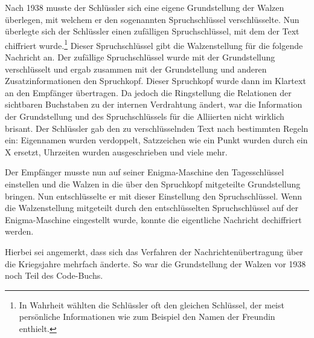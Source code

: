 \newpage

Nach 1938 musste der Schlüssler sich eine eigene Grundstellung der Walzen überlegen, mit welchem er den sogenannten Spruchschlüssel verschlüsselte.
Nun überlegte sich der Schlüssler einen \glqq zufälligen\grqq{} Spruchschlüssel, mit dem der Text chiffriert wurde.\footnote{In Wahrheit wählten die Schlüssler oft den gleichen Schlüssel, der meist persönliche Informationen wie zum Beispiel den Namen der Freundin enthielt.}
Dieser Spruchschlüssel gibt die Walzenstellung für die folgende Nachricht an.
Der \glqq zufällige\grqq{} Spruchschlüssel wurde mit der Grundstellung verschlüsselt und ergab zusammen mit der Grundstellung und anderen Zusatzinformationen den \glqq Spruchkopf\grqq.
Dieser Spruchkopf wurde dann im Klartext an den Empfänger übertragen.  
Da jedoch die Ringstellung die Relationen der sichtbaren Buchstaben zu der internen Verdrahtung ändert, war die Information der Grundstellung und des Spruchschlüssels für die Alliierten nicht wirklich brisant.
Der Schlüssler gab den zu verschlüsselnden Text nach bestimmten Regeln ein\autocite{schluesselm1940}: Eigennamen wurden verdoppelt, Satzzeichen wie ein Punkt wurden durch ein X ersetzt, Uhrzeiten wurden ausgeschrieben und viele mehr.

Der Empfänger musste nun auf seiner Enigma-Maschine den Tagesschlüssel einstellen und die Walzen in die über den Spruchkopf mitgeteilte Grundstellung bringen.
Nun entschlüsselte er mit dieser Einstellung den Spruchschlüssel.
Wenn die Walzenstellung mitgeteilt durch den entschlüsselten Spruchschlüssel auf der Enigma-Maschine eingestellt wurde, konnte die eigentliche Nachricht dechiffriert werden.

Hierbei sei angemerkt, dass sich das Verfahren der Nachrichtenübertragung über die Kriegsjahre mehrfach änderte.
So war die Grundstellung der Walzen vor 1938 noch Teil des Code-Buchs.

